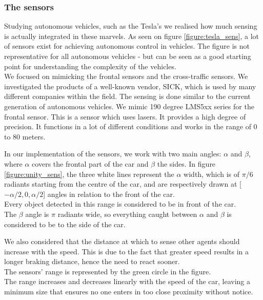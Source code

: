 \subsubsection*{The sensors}
Studying autonomous vehicles, such as the Tesla's we realised how much sensing is actually integrated in these marvels.
As seen on figure \ref{figure:tesla_sens}, a lot of sensors exist for achieving autonomous control in vehicles.
The figure is not representative for all autonomous vehicles - but can be seen as a good starting point for understanding the complexity of the vehicles.\\

We focused on mimicking the frontal sensors and the cross-traffic sensors.
We investigated the products of a well-known vendor, SICK, which is used by many different companies within the field.
The sensing is done similar to the current generation of autonomous vehicles. We mimic 190 degree LMS5xx series for the frontal sensor. This is a sensor which uses lasers. It provides a high degree of precision. It functions in a lot of different conditions and works in the range of 0 to 80 meters.
\newline

In our implementation of the sensors, we work with two main angles: $\alpha$ and $\beta$, where $\alpha$  covers the frontal part of the car and $\beta$ the sides.
In figure \ref{figure:unity_sens}, the three white lines represent the $\alpha$ width, which is of $\pi/6$ radiants starting from the centre of the car, and are respectively drawn at [$-\alpha/2, 0, \alpha/2$] angles in relation to the front of the car.\\
Every object detected in this range is considered to be in front of the car.\\

The $\beta$ angle is $\pi$ radiants wide, so everything caught between $\alpha$ and $\beta$ is considered to be to the side of the car.


We also considered that the distance at which to sense other agents should increase with the speed.
This is due to the fact that greater speed results in a longer braking distance, hence the need to react sooner.\\
The sensors' range is represented by the green circle in the figure. \\
The range increases and decreases linearly with the speed of the car, leaving a minimum size that ensures no one enters in too close proximity without notice. 



